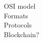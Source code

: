 \documentclass[../report.tex]{subfiles}
\begin{document}
OSI model \\

Formats \\

Protocols \\

Blockchain?
\end{document}
